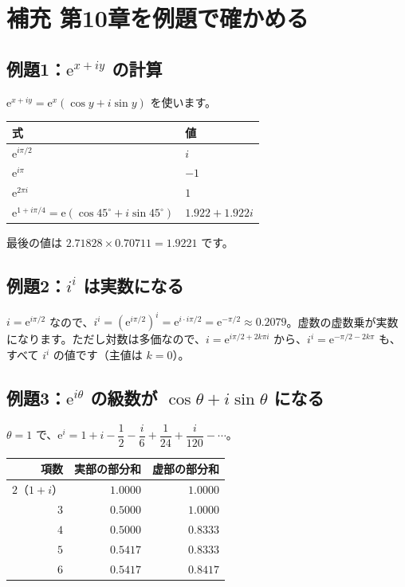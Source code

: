 \documentclass[a4paper,11pt,openany]{ltjsbook}
\newcommand{\ee}{\mathrm{e}}
\begin{document}
\section{補充 第10章を例題で確かめる}

\subsection*{例題1：$\ee^{x+iy}$ の計算}

$\ee^{x+iy}=\ee^x(\cos y+i\sin y)$ を使います。

\begin{center}
\renewcommand{\arraystretch}{1.4}
\begin{tabular}{ll}
\toprule
式 & 値\\
\midrule
$\ee^{i\pi/2}$ & $i$\\
$\ee^{i\pi}$ & $-1$\\
$\ee^{2\pi i}$ & $1$\\
$\ee^{1+i\pi/4}=\ee\left(\cos45^\circ+i\sin45^\circ\right)$ & $1.922+1.922i$\\
\bottomrule
\end{tabular}
\end{center}

最後の値は $2.71828\times0.70711=1.9221$ です。

\subsection*{例題2：$i^i$ は実数になる}

$i=\ee^{i\pi/2}$ なので、$i^i=\left(\ee^{i\pi/2}\right)^i=\ee^{i\cdot i\pi/2}=\ee^{-\pi/2}\approx0.2079$。虚数の虚数乗が実数になります。ただし対数は多価なので、$i=\ee^{i\pi/2+2k\pi i}$ から、$i^i=\ee^{-\pi/2-2k\pi}$ も、すべて $i^i$ の値です（主値は $k=0$）。

\subsection*{例題3：$\ee^{i\theta}$ の級数が $\cos\theta+i\sin\theta$ になる}

$\theta=1$ で、$\ee^{i}=1+i-\dfrac12-\dfrac{i}{6}+\dfrac1{24}+\dfrac{i}{120}-\cdots$。

\begin{center}
\begin{tabular}{rrr}
\toprule
項数 & 実部の部分和 & 虚部の部分和\\
\midrule
$2$（$1+i$） & $1.0000$ & $1.0000$\\
$3$ & $0.5000$ & $1.0000$\\
$4$ & $0.5000$ & $0.8333$\\
$5$ & $0.5417$ & $0.8333$\\
$6$ & $0.5417$ & $0.8417$\\
\bottomrule
\end{tabular}
\end{center}
\end{document}
